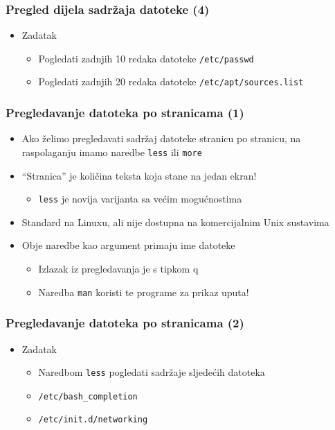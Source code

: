 \documentclass{beamer}
\newcommand{\shell}[1]{\texttt{#1}}
\begin{document}
\begin{frame}[t]
\frametitle{Pregled dijela sadržaja datoteke (4)}
\begin{itemize}
  \item Zadatak
  \begin{itemize}
    \item Pogledati zadnjih 10 redaka datoteke \shell{/etc/passwd}
    \item Pogledati zadnjih 20 redaka datoteke
          \shell{/etc/apt/sources.list}
  \end{itemize}
\end{itemize}
\end{frame}

\begin{frame}[t]
\frametitle{Pregledavanje datoteka po stranicama (1)}
\begin{itemize}
  \item Ako želimo pregledavati sadržaj datoteke stranicu po stranicu, na
        raspolaganju imamo naredbe \shell{less} ili \shell{more}
  \item ``Stranica'' je količina teksta koja stane na jedan ekran!
  \begin{itemize}
    \item \shell{less} je novija varijanta sa većim mogućnostima
  \end{itemize}
  \item Standard na Linuxu, ali nije dostupna na komercijalnim Unix 
        sustavima
  \item Obje naredbe kao argument primaju ime datoteke
  \begin{itemize}
    \item Izlazak iz pregledavanja je s tipkom q
    \item Naredba \shell{man} koristi te programe za prikaz uputa!
  \end{itemize}
\end{itemize}
\end{frame}

\begin{frame}[t]
\frametitle{Pregledavanje datoteka po stranicama (2)}
\begin{itemize}
  \item Zadatak
  \begin{itemize}
    \item Naredbom \shell{less} pogledati sadržaje sljedećih datoteka
    \item[] \shell{/etc/bash\_completion}
    \item[] \shell{/etc/init.d/networking}
  \end{itemize}
\end{itemize}
\end{frame}
\end{document}
